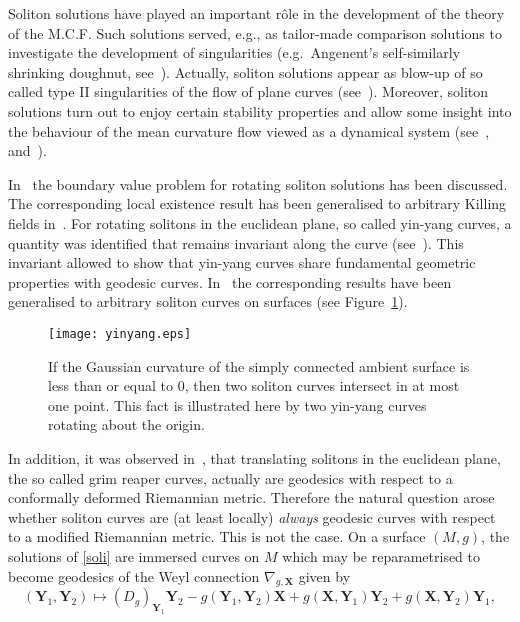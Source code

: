 \documentclass[11pt,letterpaper]{amsart}
\theoremstyle{definition}
\numberwithin{equation}{section}
\begin{document}
Soliton solutions  have played an important r\^ole  in the development
of  the  theory  of  the  M.C.F.   Such  solutions  served,  e.g.,  as
tailor-made  comparison solutions  to investigate  the  development of
singularities  (e.g.~Angenent's   self-similarly  shrinking  doughnut,
see~\cite{MR1167827}).  Actually, soliton  solutions appear as blow-up
of  so  called type  II  singularities of  the  flow  of plane  curves
(see~\cite{MR1100205}).  Moreover, soliton solutions turn out to enjoy
certain stability properties and allow some insight into the behaviour
of   the  mean   curvature   flow  viewed   as   a  dynamical   system
(see~\cite{MR1787070}, \cite{MR1855161} and~\cite{MR2321890}).

In~\cite{MR1787070}  the boundary value  problem for  rotating soliton
solutions has been discussed. The corresponding local existence result
has been  generalised to arbitrary  Killing fields in~\cite{nhbr2009}.
For  rotating solitons  in  the euclidean  plane,  so called  yin-yang
curves,  a quantity was  identified that  remains invariant  along the
curve  (see~\cite{nhbr2009}).  This  invariant  allowed to  show  that
yin-yang curves  share fundamental geometric  properties with geodesic
curves.   In~\cite{nhbr2009}  the   corresponding  results  have  been
generalised   to   arbitrary   soliton   curves   on   surfaces   (see
Figure~\ref{fig-yinyang}).
\begin{figure}[h!]
\texttt{[image: yinyang.eps]}
\caption{If  the Gaussian  curvature of  the simply  connected ambient
  surface  is  less  than or  equal  to  0,  then two  soliton  curves
  intersect in  at most one point.   This fact is  illustrated here by
  two yin-yang curves rotating about the origin.}\label{fig-yinyang}
\end{figure}
In  addition,  it was  observed  in~\cite{nhbr2009}, that  translating
solitons in  the euclidean  plane, the so  called grim  reaper curves,
actually  are  geodesics  with   respect  to  a  conformally  deformed
Riemannian  metric.   Therefore  the  natural question  arose  whether
soliton curves  are (at least locally) {\em  always\/} geodesic curves
with  respect  to  a   modified  Riemannian  metric. This is not the case. On a surface $(M,g)$, the solutions of \eqref{soli} are immersed curves on $M$ which may be reparametrised to become geodesics of the Weyl connection $\nabla_{g,{\mathbf{X}}}$ given by
$$
({\mathbf{Y}}_1,{\mathbf{Y}}_2)\mapsto (D_g)_{{\mathbf{Y}}_1} {\mathbf{Y}}_2-g({\mathbf{Y}}_1,{\mathbf{Y}}_2){\mathbf{X}}+g({\mathbf{X}},{\mathbf{Y}}_1){\mathbf{Y}}_2+g({\mathbf{X}},{\mathbf{Y}}_2){\mathbf{Y}}_1,
$$
\end{document}
